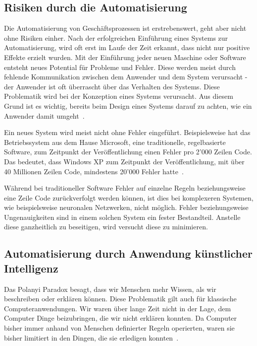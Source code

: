 \subsection{Risiken durch die Automatisierung}




Die Automatisierung von Geschäftsprozessen ist erstrebenswert, geht aber nicht ohne Risiken einher.
Nach der erfolgreichen Einführung eines Systems zur Automatisierung, wird oft erst im Laufe der Zeit erkannt, dass nicht nur positive Effekte erzielt wurden. Mit der Einführung jeder neuen Maschine oder Software entsteht neues Potential für Probleme und Fehler. Diese werden meist durch fehlende Kommunikation zwischen dem Anwender und dem System verursacht - der Anwender ist oft überrascht über das Verhalten des Systems. Diese Problematik wird bei der Konzeption eines Systems verursacht. Aus diesem Grund ist es wichtig, bereits beim Design eines Systems darauf zu achten, wie ein Anwender damit umgeht~\autocite{Sarter1997}. 

Ein neues System wird meist nicht ohne Fehler eingeführt. Beispielsweise hat das Betriebssystem aus dem Hause Microsoft, eine traditionelle, regelbasierte Software, zum Zeitpunkt der Veröffentlichung einen Fehler pro 2'000 Zeilen Code. Das bedeutet, dass Windows XP zum Zeitpunkt der Veröffentlichung, mit über 40 Millionen Zeilen Code, mindestens 20'000 Fehler hatte~\autocite{TheEconomist2010}. 

Während bei traditioneller Software Fehler auf einzelne Regeln beziehungsweise eine Zeile Code zurückverfolgt werden können, ist dies bei komplexeren Systemen, wie beispielsweise neuronalen Netzwerken, nicht möglich. Fehler beziehungsweise Ungenauigkeiten sind in einem solchen System ein fester Bestandteil. Anstelle diese ganzheitlich zu beseitigen, wird versucht diese zu minimieren\autocite{VanRijsbergen1979}.

\subsection{Automatisierung durch Anwendung künstlicher Intelligenz}

Das Polanyi Paradox besagt, dass wir Menschen mehr Wissen, als wir beschreiben oder erklären können. Diese Problematik gilt auch für klassische Computeranwendungen. Wir waren über lange Zeit nicht in der Lage, dem Computer Dinge beizubringen, die wir nicht erklären konnten. Da Computer bisher immer anhand von Menschen definierter Regeln operierten, waren sie bisher limitiert in den Dingen, die sie erledigen konnten~\autocite{McAfee}. 

